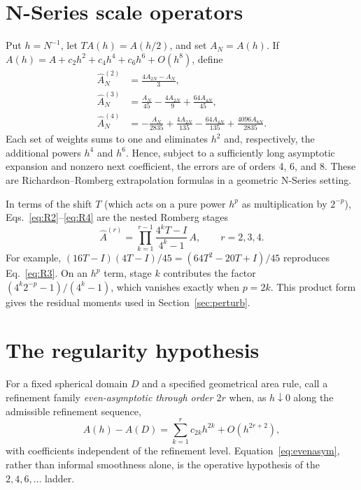 \documentclass[11pt]{article}
\theoremstyle{remark}
\newcommand{\Ahat}{\widehat{A}}
\begin{document}
\section{N-Series scale operators}\label{sec:operators}
Put $h=N^{-1}$, let $TA(h)=A(h/2)$, and set $A_N=A(h)$. If
$A(h)=A+c_2h^2+c_4h^4+c_6h^6+O(h^8)$, define
\begin{align}
\Ahat^{(2)}_N &= \frac{4A_{2N}-A_N}{3}, \label{eq:R2}\\
\Ahat^{(3)}_N &= \frac{A_N}{45}-\frac{4A_{2N}}{9}+\frac{64A_{4N}}{45}, \label{eq:R3}\\
\Ahat^{(4)}_N &= -\frac{A_N}{2835}+\frac{4A_{2N}}{135}-\frac{64A_{4N}}{135}+\frac{4096A_{8N}}{2835}. \label{eq:R4}
\end{align}
Each set of weights sums to one and eliminates $h^2$ and, respectively, the additional powers
$h^4$ and $h^6$. Hence, subject to a sufficiently long asymptotic expansion and nonzero next
coefficient, the errors are of orders 4, 6, and 8. These are Richardson--Romberg extrapolation
formulas in a geometric N-Series setting.

In terms of the shift $T$ (which acts on a pure power $h^p$ as multiplication by $2^{-p}$),
Eqs.~\eqref{eq:R2}--\eqref{eq:R4} are the nested Romberg stages
\[
\Ahat^{(r)}=\prod_{k=1}^{r-1}\frac{4^{k}T-I}{4^{k}-1}\,A,\qquad r=2,3,4 .
\]
For example, $(16T-I)(4T-I)/45=(64T^2-20T+I)/45$ reproduces Eq.~\eqref{eq:R3}. On an $h^p$
term, stage $k$ contributes the factor $(4^k2^{-p}-1)/(4^k-1)$, which vanishes exactly when
$p=2k$. This product form gives the residual moments used in Section~\ref{sec:perturb}.

\section{The regularity hypothesis}\label{sec:regularity}
For a fixed spherical domain $D$ and a specified geometrical area rule, call a refinement
family \emph{even-asymptotic through order $2r$} when, as $h\downarrow0$ along the admissible
refinement sequence,
\begin{equation}\label{eq:evenasym}
A(h)-A(D)=\sum_{k=1}^{r}c_{2k}h^{2k}+O(h^{2r+2}),
\end{equation}
with coefficients independent of the refinement level. Equation~\eqref{eq:evenasym}, rather
than informal smoothness alone, is the operative hypothesis of the $2,4,6,\dots$ ladder.
\end{document}
